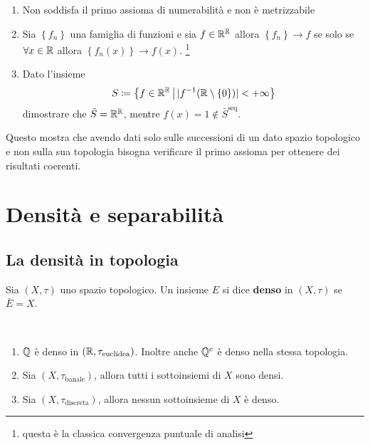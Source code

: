 \begin{remark}
\begin{enumerate}
\begin{proof}
\begin{enumerate}
			\end{enumerate}
		per cui, sì, genera una ed una sola topologia.
		\end{proof}
		\item Non soddisfa il primo assioma di numerabilità e non è metrizzabile
		\item Sia $\left\{f_n\right\}$ una famiglia di funzioni e sia $f \in \mathbb{R}^{\mathbb{R}}$ allora $\left\{f_n\right\} \rightarrow f$ se solo se $\forall x \in \mathbb{R}$ allora $\left\{f_n(x)\right\} \rightarrow f(x)$. \footnote{questa è la classica convergenza puntuale di analisi}
		\item Dato l'insieme 
		\begin{equation*}
			S \coloneqq \left\{ f \in \mathbb{R}^{\mathbb{R}} \,\middle|\, |f^{-1}(\mathbb{R} \setminus \left\{0\right\})| < +\infty \right\}
		\end{equation*}
		dimostrare che $\bar{S} = \mathbb{R}^{\mathbb{R}}$, mentre $f(x)= 1 \notin \bar{S}^\text{seq}$. 
	\end{enumerate}
	\end{remark}

Questo mostra che avendo dati solo sulle successioni di un dato spazio topologico e non sulla sua topologia bisogna verificare il primo assioma per ottenere dei risultati coerenti.

\section{Densità e separabilità}
\subsection{\textcolor{TopGener}{\textbf{La densità in topologia}}}



\begin{definition}
	Sia $(X,\tau)$ uno spazio topologico. Un insieme $E$ si dice \textbf{denso} in $(X, \tau)$ se $\bar{E} = X$. 
\end{definition}

\begin{example}\
\begin{enumerate}
	\item $\mathbb{Q}$ è denso in $(\mathbb{R}, \tau_{\text{euclidea}})$. Inoltre anche $\mathbb{Q}^c$ è denso nella stessa topologia.
	\item Sia $(X,\tau_{\text{banale}})$, allora tutti i sottoinsiemi di $X$ sono densi.
	\item Sia $(X,\tau_{\text{discreta}})$, allora nessun sottoinsieme di $X$ è denso.
\end{enumerate}
\end{example}

